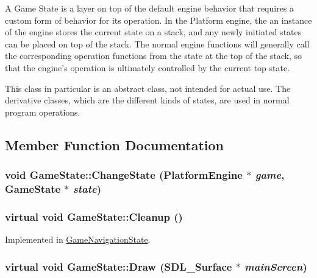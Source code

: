 A Game State is a layer on top of the default engine behavior that requires a custom form of behavior for its operation. In the Platform engine, the an instance of the engine stores the current state on a stack, and any newly initiated states can be placed on top of the stack. The normal engine functions will generally call the corresponding operation functions from the state at the top of the stack, so that the engine's operation is ultimately controlled by the current top state.

This class in particular is an abstract class, not intended for actual use. The derivative classes, which are the different kinds of states, are used in normal program operations. 

\subsection{Member Function Documentation}
\hypertarget{class_game_state_f786aeb704a22a135dc289bb89fcc452}{
\subsubsection[{ChangeState}]{\setlength{\rightskip}{0pt plus 5cm}void GameState::ChangeState ({\bf PlatformEngine} $\ast$ {\em game}, \/  {\bf GameState} $\ast$ {\em state})}}
\label{dd/d87/class_game_state_f786aeb704a22a135dc289bb89fcc452}


\hypertarget{class_game_state_041e7a5430d71da84745af11abdacd93}{
\subsubsection[{Cleanup}]{\setlength{\rightskip}{0pt plus 5cm}virtual void GameState::Cleanup ()}}
\label{dd/d87/class_game_state_041e7a5430d71da84745af11abdacd93}




Implemented in \hyperlink{class_game_navigation_state_f93a7dbb7eac4b14a6d59cbca32b9abd}{GameNavigationState}.\hypertarget{class_game_state_1b93233932defca939eed4c0676a5d2a}{
\subsubsection[{Draw}]{\setlength{\rightskip}{0pt plus 5cm}virtual void GameState::Draw (SDL\_\-Surface $\ast$ {\em mainScreen})}}
\label{dd/d87/class_game_state_1b93233932defca939eed4c0676a5d2a}





